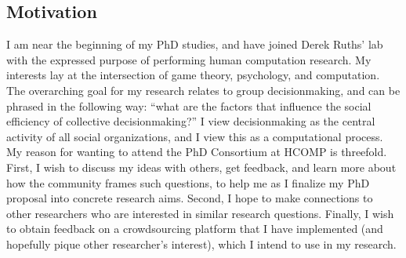 \documentclass[letterpaper,twocolumn]{article}
\begin{document}
\subsection*{Motivation}
I am near the beginning of my PhD studies, and have joined Derek Ruths' lab 
with the expressed purpose of performing human computation research.
My interests lay at the intersection of game theory, psychology, and 
computation.  The overarching goal for my research relates to group 
decisionmaking, and can be phrased in the following way: ``what are the factors
that influence the social efficiency of collective decisionmaking?'' I
view decisionmaking as the central activity of all social organizations, and 
I view this as a computational process.  My reason for 
wanting to attend the PhD Consortium at HCOMP is threefold.  First, I wish to
discuss my ideas with others, get feedback, and learn more about how the 
community frames such questions, to help me as I finalize my PhD proposal 
into concrete research aims.  Second, I hope to make connections to other 
researchers who are interested in similar research questions.  Finally, I wish
to obtain feedback on a crowdsourcing platform that I have implemented (and
hopefully pique other researcher's interest), which I intend to use in my
research.
\end{document}
